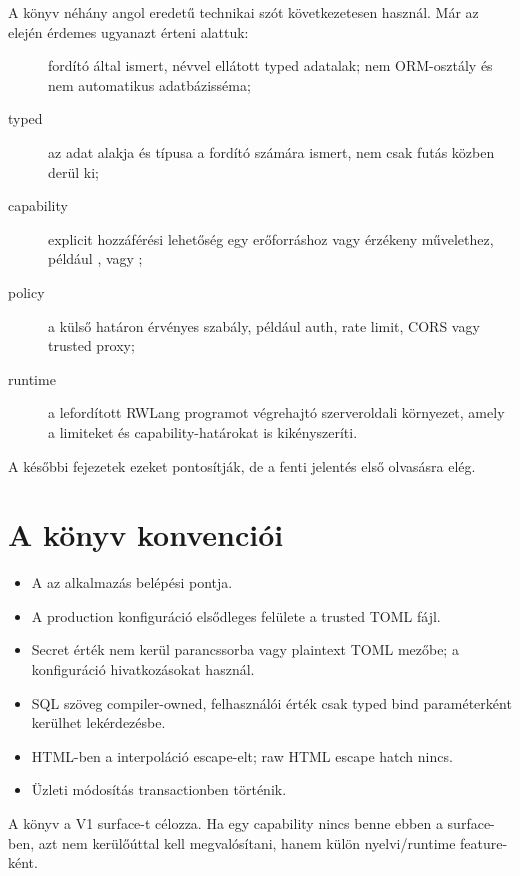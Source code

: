 A könyv néhány angol eredetű technikai szót következetesen használ. Már az elején érdemes ugyanazt érteni alattuk:

\begin{description}
  \item[] fordító által ismert, névvel ellátott typed adatalak; nem ORM-osztály és nem automatikus adatbázisséma;
  \item[typed] az adat alakja és típusa a fordító számára ismert, nem csak futás közben derül ki;
  \item[capability] explicit hozzáférési lehetőség egy erőforráshoz vagy érzékeny művelethez, például ,  vagy ;
  \item[policy] a külső határon érvényes szabály, például auth, rate limit, CORS vagy trusted proxy;
  \item[runtime] a lefordított RWLang programot végrehajtó szerveroldali környezet, amely a limiteket és capability-határokat is kikényszeríti.
\end{description}

A későbbi fejezetek ezeket pontosítják, de a fenti jelentés első olvasásra elég.

\section*{A könyv konvenciói}

\begin{itemize}
  \item A  az alkalmazás belépési pontja.
  \item A production konfiguráció elsődleges felülete a trusted TOML fájl.
  \item Secret érték nem kerül parancssorba vagy plaintext TOML mezőbe; a konfiguráció  hivatkozásokat használ.
  \item SQL szöveg compiler-owned, felhasználói érték csak typed bind paraméterként kerülhet lekérdezésbe.
  \item HTML-ben a  interpoláció escape-elt; raw HTML escape hatch nincs.
  \item Üzleti módosítás transactionben történik.
\end{itemize}

A könyv a V1 surface-t célozza. Ha egy capability nincs benne ebben a surface-ben, azt nem kerülőúttal kell megvalósítani, hanem külön nyelvi/runtime feature-ként.
